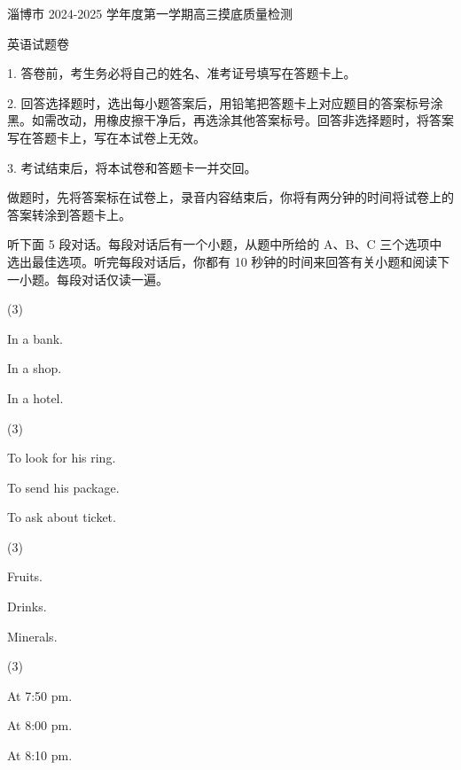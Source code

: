 \documentclass{英语试卷}
\begin{document}
\par 淄博市 2024-2025 学年度第一学期高三摸底质量检测\par
\par 英语试题卷\par
\begin{notice}
\par 1. 答卷前，考生务必将自己的姓名、准考证号填写在答题卡上。\par
\par 2. 回答选择题时，选出每小题答案后，用铅笔把答题卡上对应题目的答案标号涂黑。如需改动，用橡皮擦干净后，再选涂其他答案标号。回答非选择题时，将答案写在答题卡上，写在本试卷上无效。\par
\par 3. 考试结束后，将本试卷和答题卡一并交回。\par
\end{notice}
\par 做题时，先将答案标在试卷上，录音内容结束后，你将有两分钟的时间将试卷上的答案转涂到答题卡上。\par
{}
\par 听下面 5 段对话。每段对话后有一个小题，从题中所给的 A、B、C 三个选项中选出最佳选项。听完每段对话后，你都有 10 秒钟的时间来回答有关小题和阅读下一小题。每段对话仅读一遍。\par
{}
\begin{choices}(3)
  \item In a bank.
  \item In a shop.
  \item In a hotel.
\end{choices}
\begin{choices}(3)
  \item To look for his ring.
  \item To send his package.
  \item To ask about ticket.
\end{choices}
\begin{choices}(3)
  \item Fruits.
  \item Drinks.
  \item Minerals.
\end{choices}
\begin{choices}(3)
  \item At 7:50 pm.
  \item At 8:00 pm.
  \item At 8:10 pm.
\end{choices}
\end{document}
